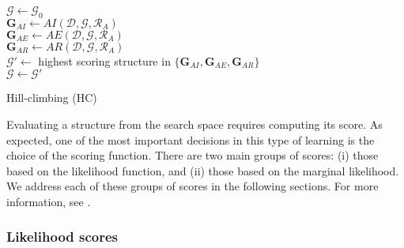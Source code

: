 \begin{algorithm}[t!]
	\BlankLine
	$\mathcal{G} \leftarrow \mathcal{G}_{0}$  \\
	{
		$\mathbf{G}_{AI} \leftarrow AI(\mathcal{D}, \mathcal{G}, \mathcal{R}_{A})$ \\
		$\mathbf{G}_{AE} \leftarrow AE(\mathcal{D}, \mathcal{G}, \mathcal{R}_{A})$ \\
		$\mathbf{G}_{AR} \leftarrow AR(\mathcal{D}, \mathcal{G}, \mathcal{R}_{A})$ \\
		$\mathcal{G}' \leftarrow $ highest scoring structure in $\{\mathbf{G}_{AI}, \mathbf{G}_{AE}, \mathbf{G}_{AR}\}$\\
		{
			$\mathcal{G} \leftarrow \mathcal{G}'$
		}
	}
	\BlankLine
	\caption{Hill-climbing (HC)}
	\label{alg:2_hill_climbing}
\end{algorithm}

Evaluating a structure from the search space requires computing its score. As expected, one of the most important decisions in this type of learning is the choice of the scoring function. There are two main groups of scores: (i) those based on the likelihood function, and (ii) those based on the marginal likelihood. We address each of these groups of scores in the following sections. For more information, see \cite{carvalho2009}. 

\subsubsection*{Likelihood scores}

